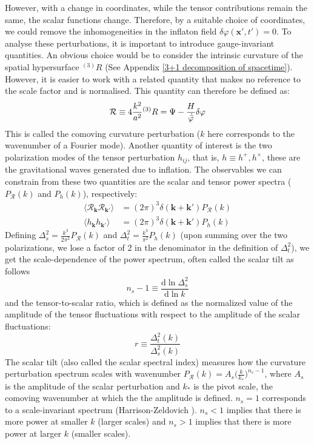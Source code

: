 \documentclass[aps,prd,reprint,preprintnumbers,showpacs,floatfix,nofootinbib,superscript address]{revtex4-2}
\begin{document}
However, with a change in coordinates, while the tensor contributions remain the same, the scalar functions change. Therefore, by a suitable choice of coordinates, we could remove the inhomogeneities in the inflaton field $\delta \varphi(\textbf{x}',t') = 0$. To analyse these perturbations, it is important to introduce gauge-invariant quantities. An obvious choice would be to consider the intrinsic curvature of the spatial hypersurface ${}^{(3)}R$ (See Appendix \ref{3+1 decomposition of spacetime}). However, it is easier to work with a related quantity that makes no reference to the scale factor and is normalised. This quantity can therefore be defined as:
\begin{equation} \label{comoving curvature perurbation}
    \mathcal{R} \equiv 4 \frac{k^2}{a^2} {}^{(3)}R = \Psi - \frac{H}{\dot{\Bar{\varphi}}}\delta \varphi
\end{equation}
This is called the comoving curvature perturbation ($k$ here corresponds to the wavenumber of a Fourier mode). Another quantity of interest is the two polarization modes of the tensor perturbation $h_{ij}$, that is, $h \equiv h^+ , h^\times$, these are the gravitational waves generated due to inflation. The observables we can constrain from these two quantities are the scalar and tensor power spectra ($P_\mathcal{R}(k)$ and $P_h(k)$), respectively:
\begin{align}
    \langle \mathcal{R}_{\bm{k}} \mathcal{R}_{\bm{k}'} \rangle &= (2\pi)^3 \delta(\bm{k}+\bm{k}')P_\mathcal{R}(k) \\
    \langle h_{\bm{k}} h_{\bm{k}'} \rangle &= (2\pi)^3 \delta(\bm{k}+\bm{k}')P_h(k)
\end{align}
Defining $\Delta_s^2 = \frac{k^3}{2\pi^2} P_\mathcal{R}(k)$ and $\Delta_t^2 = \frac{k^3}{\pi^2} P_h(k)$ (upon summing over the two polarizations, we lose a factor of 2 in the denominator in the definition of $\Delta_t^2$), we get the scale-dependence of the power spectrum, often called the scalar tilt as follows
\begin{equation}
    n_s - 1 \equiv \frac{\text{d} \ln \Delta_s^2}{\text{d} \ln k}
\end{equation}
and the tensor-to-scalar ratio, which is defined as the normalized value of the amplitude of the tensor fluctuations with respect to the amplitude of the scalar fluctuations:
\begin{equation}
    r \equiv \frac{\Delta_t^2(k)}{\Delta_s^2(k)}
\end{equation}
The scalar tilt (also called the scalar spectral index) measures how the curvature perturbation spectrum scales with wavenumber $P_\mathcal{R}(k) = A_s\big(\frac{k}{k_*}\big)^{n_s-1}$, where $A_s$ is the amplitude of the scalar perturbation and $k_*$ is the pivot scale, the comoving wavenumber at which the the amplitude is defined. $n_s = 1$ corresponds to a scale-invariant spectrum (Harrison‑Zeldovich \cite{harrison_fluctuations_1970, zeldovich_hypothesis_1972, peebles_primeval_1970}). $n_s < 1$ implies that there is more power at smaller $k$ (larger scales) and $n_s > 1$ implies that there is more power at larger $k$ (smaller scales). 
\end{document}
